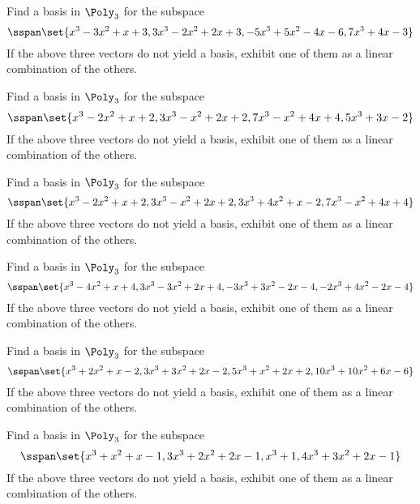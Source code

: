 \begin{ex}
  Find a basis in $\Poly_{3}$ for the subspace
  \begin{equation*}
    \sspan\set{
      x^{3}-3x^{2}+x+3,3x^{3}-2x^{2}+2x+3,-5x^{3}+5x^{2}-4x-6,7x^{3}+4x-3}
  \end{equation*}
  If the above three vectors do not yield a basis, exhibit one
  of them as a linear combination of the others.
\end{ex}

\begin{ex}
  Find a basis in $\Poly_{3}$ for the subspace
  \begin{equation*}
    \sspan\set{
      x^{3}-2x^{2}+x+2,3x^{3}-x^{2}+2x+2,7x^{3}-x^{2}+4x+4,5x^{3}+3x-2}
  \end{equation*}
  If the above three vectors do not yield a basis, exhibit one
  of them as a linear combination of the others.
\end{ex}

\begin{ex}
  Find a basis in $\Poly_{3}$ for the subspace
  \begin{equation*}
    \sspan\set{
      x^{3}-2x^{2}+x+2,3x^{3}-x^{2}+2x+2,3x^{3}+4x^{2}+x-2,7x^{3}-x^{2}+4x+4
    }
  \end{equation*}
  If the above three vectors do not yield a basis, exhibit one
  of them as a linear combination of the others.
\end{ex}

\begin{ex}
  Find a basis in $\Poly_{3}$ for the subspace
  \begin{equation*}
    \sspan\set{
      x^{3}-4x^{2}+x+4,3x^{3}-3x^{2}+2x+4,-3x^{3}+3x^{2}-2x-4,-2x^{3}+4x^{2}-2x-4
    }
  \end{equation*}
  If the above three vectors do not yield a basis, exhibit one
  of them as a linear combination of the others.
\end{ex}

\begin{ex}
  Find a basis in $\Poly_{3}$ for the subspace
  \begin{equation*}
    \sspan\set{
      x^{3}+2x^{2}+x-2,3x^{3}+3x^{2}+2x-2,5x^{3}+x^{2}+2x+2,10x^{3}+10x^{2}+6x-6
    }
  \end{equation*}
  If the above three vectors do not yield a basis, exhibit one
  of them as a linear combination of the others.
\end{ex}

\begin{ex}
  Find a basis in $\Poly_{3}$ for the subspace
  \begin{equation*}
    \sspan\set{
      x^{3}+x^{2}+x-1,3x^{3}+2x^{2}+2x-1,x^{3}+1,4x^{3}+3x^{2}+2x-1}
  \end{equation*}
  If the above three vectors do not yield a basis, exhibit one
  of them as a linear combination of the others.
\end{ex}

